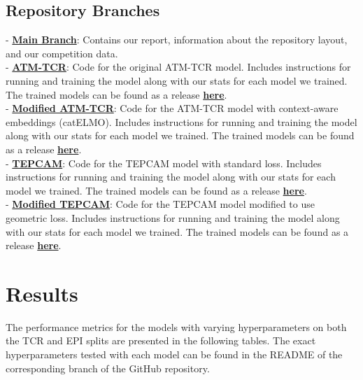 \documentclass[11pt,a4paper]{article}
\begin{document}
\subsection{Repository Branches}
- \href{https://github.com/imaad-uni/cse494-599-Project/tree/main}{\textbf{Main Branch}}: Contains our report, information about the repository layout, and our competition data.\\
- \textbf{\href{https://github.com/imaad-uni/cse494-599-Project/tree/ATM-TCR}{ATM-TCR}}: Code for the original ATM-TCR model. Includes instructions for running and training the model along with our stats for each model we trained. The trained models can be found as a release \href{https://github.com/imaad-uni/cse494-599-Project/releases/tag/v1.0.0-ATM-TCR}{\textbf{here}}.\\
- \textbf{\href{https://github.com/imaad-uni/cse494-599-Project/tree/Modified-ATM-TCR}{Modified ATM-TCR}}: Code for the ATM-TCR model with context-aware embeddings (catELMO). Includes instructions for running and training the model along with our stats for each model we trained. The trained models can be found as a release \href{https://github.com/imaad-uni/cse494-599-Project/releases/tag/v1.0.0-Modified-ATM-TCR}{\textbf{here}}.\\
- \textbf{\href{https://github.com/imaad-uni/cse494-599-Project/tree/TEPCAM}{TEPCAM}}: Code for the TEPCAM model with standard loss. Includes instructions for running and training the model along with our stats for each model we trained. The trained models can be found as a release \href{https://github.com/imaad-uni/cse494-599-Project/releases/tag/v1.0.0-TEPCAM}{\textbf{here}}.\\
- \textbf{\href{https://github.com/imaad-uni/cse494-599-Project/tree/Modified-TEPCAM}{Modified TEPCAM}}: Code for the TEPCAM model modified to use geometric loss. Includes instructions for running and training the model along with our stats for each model we trained. The trained models can be found as a release \href{https://github.com/imaad-uni/cse494-599-Project/releases/tag/v1.0.0-Modified-TEPCAM}{\textbf{here}}.

\section{Results}
The performance metrics for the models with varying hyperparameters on both the TCR and EPI splits are presented in the following tables. The exact hyperparameters tested with each model can be found in the README of the corresponding branch of the GitHub repository.
\end{document}
